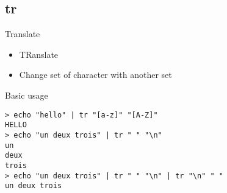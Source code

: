 \subsection{tr}

\begin{frame}[fragile]{Translate}
  \begin{itemize}
    \pause \item TRanslate
    \pause \item Change set of character with another set
  \end{itemize}
  \pause

  \begin{exampleblock}{Basic usage}
    \begin{lstlisting}[showstringspaces=false,basicstyle=\tiny]
> echo "hello" | tr "[a-z]" "[A-Z]"
HELLO
> echo "un deux trois" | tr " " "\n"
un
deux
trois
> echo "un deux trois" | tr " " "\n" | tr "\n" " "
un deux trois
    \end{lstlisting}
  \end{exampleblock}
\end{frame}
